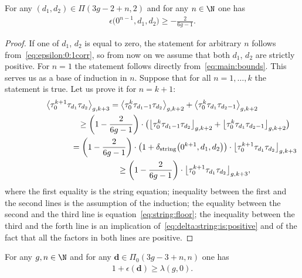 \begin{Corollary}\label{cor:epsilon:0:2corr}
For any $(d_1,d_2)\in\Pi(3g-2+n,2)$ and for any $n\in\N$
one has
\begin{gather}\label{eq:epsilon:0:2corr}
\epsilon\big(0^{n-1},d_1,d_2\big)\ge -\frac{2}{6g-1} .
\end{gather}
\end{Corollary}
\begin{proof}If one of $d_1$, $d_2$
is equal to zero, the statement for arbitrary $n$
follows from~\eqref{eq:epsilon:0:1corr}, so from now on
we assume
that both $d_1$, $d_2$ are strictly positive.
For $n=1$ the statement follows directly from~\eqref{eq:main:bounds}.
This serves us as a base of induction
in $n$. Suppose that for all $n=1,\dots,k$ the statement
is true. Let us prove it for $n=k+1$:
\begin{gather*}
\big\langle \tau_0^{k+1}\tau_{d_1}\tau_{d_2}\big\rangle_{g,k+3}
=\big\langle \tau_0^k\tau_{d_1-1}\tau_{d_2}\big\rangle_{g,k+2}
+\big\langle \tau_0^k\tau_{d_1}\tau_{d_2-1}\big\rangle_{g,k+2}\\
\hphantom{\big\langle \tau_0^{k+1}\tau_{d_1}\tau_{d_2}\big\rangle_{g,k+3}}{} \ge
\left(1-\frac{2}{6g-1}\right)\cdot
\big(\big\lfloor \tau_0^k\tau_{d_1-1}\tau_{d_2}\big\rfloor_{g,k+2}
+\big\lfloor \tau_0^k\tau_{d_1}\tau_{d_2-1}\big\rfloor_{g,k+2}
\big)\\
\hphantom{\big\langle \tau_0^{k+1}\tau_{d_1}\tau_{d_2}\big\rangle_{g,k+3}}{}
 =
\left(1-\frac{2}{6g-1}\right)
\cdot\big(1+\delta_{\rm string}\big(0^{k+1},d_1,d_2\big)\big)\cdot
\big\lfloor \tau_0^{k+1}\tau_{d_1}\tau_{d_2}\big\rfloor_{g,k+3}\\
\hphantom{\big\langle \tau_0^{k+1}\tau_{d_1}\tau_{d_2}\big\rangle_{g,k+3}}{} \ge
\left(1-\frac{2}{6g-1}\right)\cdot
\big\lfloor \tau_0^{k+1}\tau_{d_1}\tau_{d_2}\big\rfloor_{g,k+3} ,
\end{gather*}
where the first equality is the string equation;
inequality between the first and the second lines is
the assumption of the induction; the equality
between the second and the third line is
equation~\eqref{eq:string:floor}; the inequality
between the third and the forth line is
an implication of~\eqref{eq:delta:string:is:positive}
and of the fact that all the factors in both lines are
positive.
\end{proof}

\begin{Corollary}\label{cor:L:equals:0}
For any $g,n\in\N$ and for any
$\boldsymbol{d}\in\Pi_0(3g-3+n,n)$ one has
\begin{gather}\label{eq:epsilon:is:smaller:than:lambda:0}
1+\epsilon(\boldsymbol{d})\ge\lambda(g,0) .
\end{gather}
\end{Corollary}

